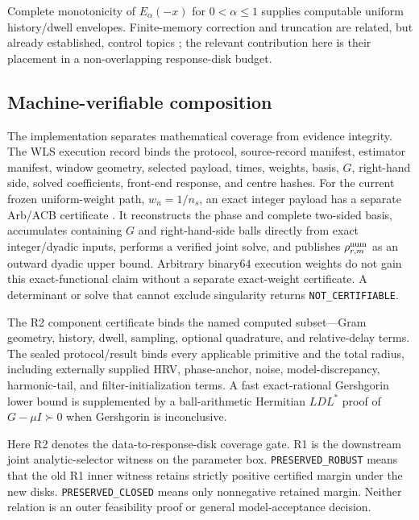 \documentclass[11pt]{article}
\theoremstyle{definition}
\theoremstyle{remark}
\newcommand{\status}[1]{\texttt{#1}}
\begin{document}
Complete monotonicity of $E_\alpha(-x)$ for $0<\alpha\le1$
\cite{pollard1948,simon2014} supplies computable uniform history/dwell
envelopes.  Finite-memory correction and truncation are related, but already
established, control topics \cite{rauhmalti2023,rauhlahme2025}; the relevant
contribution here is their placement in a non-overlapping response-disk
budget.

\subsection{Machine-verifiable composition}

The implementation separates mathematical coverage from evidence integrity.
The WLS execution record binds the protocol, source-record manifest, estimator
manifest, window geometry, selected payload, times, weights, basis, $G$,
right-hand side, solved coefficients, front-end response, and centre hashes.
For the current frozen uniform-weight path, $w_n=1/n_s$, an exact integer
payload has a separate Arb/ACB certificate \cite{johansson2017}.  It
reconstructs the phase and complete two-sided basis, accumulates containing
$G$ and right-hand-side balls directly from exact integer/dyadic inputs,
performs a verified joint solve, and publishes $\rho^{\rm num}_{r,m}$ as an
outward dyadic upper bound.  Arbitrary binary64 execution weights do not gain
this exact-functional claim without a separate exact-weight certificate.  A
determinant or solve that cannot exclude singularity returns
\status{NOT\_CERTIFIABLE}.

The R2 component certificate binds the named computed subset---Gram geometry,
history, dwell, sampling, optional quadrature, and relative-delay terms.  The
sealed protocol/result binds every applicable primitive and the total radius,
including externally supplied HRV, phase-anchor, noise, model-discrepancy,
harmonic-tail, and filter-initialization terms.  A fast exact-rational
Gershgorin lower bound is supplemented by a ball-arithmetic Hermitian $LDL^*$
proof of $G-\mu I\succ0$ when Gershgorin is inconclusive.

Here R2 denotes the data-to-response-disk coverage gate.  R1 is the downstream
joint analytic-selector witness on the parameter box.
\status{PRESERVED\_ROBUST} means that the old R1 inner witness retains
strictly positive certified margin under the new disks.
\status{PRESERVED\_CLOSED} means only nonnegative retained margin.  Neither
relation is an outer feasibility proof or general model-acceptance decision.
\end{document}
